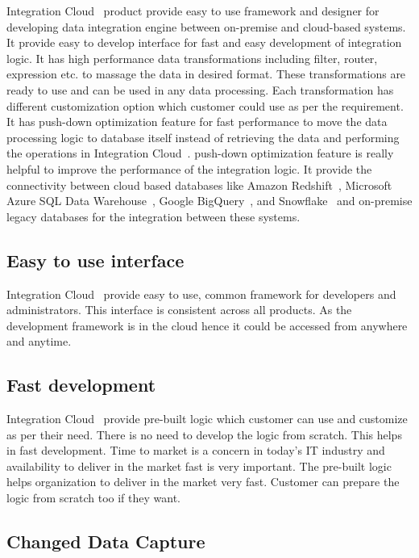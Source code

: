 Integration Cloud~\cite{hid-sp18-511-iics} product provide easy to use
framework and designer for developing data integration engine between
on-premise and cloud-based systems. It provide easy to develop
interface for fast and easy development of integration logic. It has
high performance data transformations including filter, router,
expression etc. to massage the data in desired format. These
transformations are ready to use and can be used in any data
processing. Each transformation has different customization option
which customer could use as per the requirement. It has push-down
optimization feature for fast performance to move the data processing
logic to database itself instead of retrieving the data and performing
the operations in Integration
Cloud~\cite{hid-sp18-511-iics}. push-down optimization feature is
really helpful to improve the performance of the integration logic. It
provide the connectivity between cloud based databases like Amazon
Redshift~\cite{hid-sp18-511-aws-redshift}, Microsoft Azure SQL Data
Warehouse~\cite{hid-sp18-511-ms-azure-sql}, Google
BigQuery~\cite{hid-sp18-511-google-bigquery}, and
Snowflake~\cite{hid-sp18-511-snowflake} and on-premise legacy
databases for the integration between these systems.

\subsection{Easy to use interface}

Integration Cloud~\cite{hid-sp18-511-iics} provide easy to use, common
framework for developers and administrators. This interface is
consistent across all products. As the development framework is in the
cloud hence it could be accessed from anywhere and anytime.

\subsection{Fast development}

Integration Cloud~\cite{hid-sp18-511-iics} provide pre-built logic
which customer can use and customize as per their need. There is no
need to develop the logic from scratch. This helps in fast
development. Time to market is a concern in today's IT industry and
availability to deliver in the market fast is very important. The
pre-built logic helps organization to deliver in the market very
fast. Customer can prepare the logic from scratch too if they want.

\subsection{Changed Data Capture}

